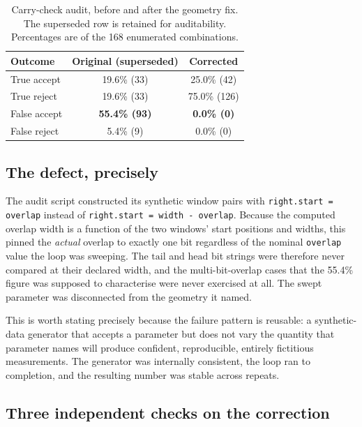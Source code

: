 \documentclass[preprint,11pt]{elsarticle}
\begin{document}
\begin{table}[h]
\centering\small
\caption{Carry-check audit, before and after the geometry fix. The
superseded row is retained for auditability. Percentages are of the 168
enumerated combinations.}
\label{tab:audit}
\begin{tabular}{@{}lcc@{}}
\toprule
Outcome & Original (superseded) & Corrected \\
\midrule
True accept  & 19.6\% (33) & 25.0\% (42) \\
True reject  & 19.6\% (33) & 75.0\% (126) \\
False accept & \textbf{55.4\% (93)} & \textbf{0.0\% (0)} \\
False reject & 5.4\% (9)   & 0.0\% (0) \\
\bottomrule
\end{tabular}
\end{table}

\subsection{The defect, precisely}

The audit script constructed its synthetic window pairs with
\texttt{right.start = overlap} instead of
\texttt{right.start = width - overlap}. Because the computed overlap
width is a function of the two windows' start positions and widths, this
pinned the \emph{actual} overlap to exactly one bit regardless of the
nominal \texttt{overlap} value the loop was sweeping. The
$\mathrm{tail}$ and $\mathrm{head}$ bit strings were therefore never
compared at their declared width, and the multi-bit-overlap cases that
the 55.4\% figure was supposed to characterise were never exercised at
all. The swept parameter was disconnected from the geometry it named.

This is worth stating precisely because the failure pattern is reusable:
a synthetic-data generator that accepts a parameter but does not vary the
quantity that parameter names will produce confident, reproducible,
entirely fictitious measurements. The generator was internally
consistent, the loop ran to completion, and the resulting number was
stable across repeats.

\subsection{Three independent checks on the correction}
\end{document}
